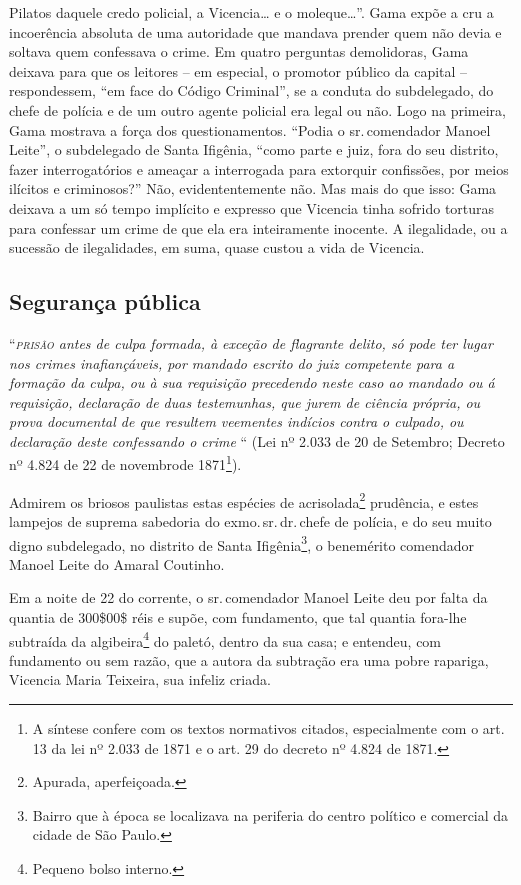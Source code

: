 \begin{didascalia}
{Pilatos daquele credo policial, a Vicencia\ldots{} e o moleque\ldots{}''. Gama
expõe a cru a incoerência absoluta de uma autoridade que mandava prender
quem não devia e soltava quem confessava o crime. Em quatro perguntas
demolidoras, Gama deixava para que os leitores -- em especial, o
promotor público da capital -- respondessem, ``em face do Código
Criminal'', se a conduta do subdelegado, do chefe de polícia e de um
outro agente policial era legal ou não. Logo na primeira, Gama mostrava
a força dos questionamentos. ``Podia o sr.\,comendador Manoel Leite'', o
subdelegado de Santa Ifigênia, ``como parte e juiz, fora do seu distrito,
fazer interrogatórios e ameaçar a interrogada para extorquir confissões,
por meios ilícitos e criminosos?'' Não, evidententemente não. Mas mais do
que isso: Gama deixava a um só tempo implícito e expresso que Vicencia
tinha sofrido torturas para confessar um crime de que ela era
inteiramente inocente. A ilegalidade, ou a sucessão de ilegalidades, em
suma, quase custou a vida de Vicencia.}
\end{didascalia}

\subsection{Segurança pública}

``\emph{\textsc{prisão} antes de culpa formada, à exceção de flagrante delito, só
pode ter lugar nos crimes inafiançáveis, por mandado escrito do juiz
competente para a formação da culpa, ou à sua requisição precedendo
neste caso ao mandado ou á requisição, declaração de duas testemunhas,
que jurem de ciência própria, ou prova documental de que resultem
veementes indícios contra o culpado, ou declaração deste confessando o
crime} `` (Lei nº 2.033 de 20 de Setembro; Decreto nº 4.824 de 22 de
novembrode 1871\footnote{ A síntese confere com os textos normativos
  citados, especialmente com o art. 13 da lei nº 2.033 de 1871 e o art.
  29 do decreto nº 4.824 de 1871.}).

Admirem os briosos paulistas estas espécies de acrisolada\footnote{
  Apurada, aperfeiçoada.} prudência, e estes lampejos de suprema
sabedoria do exmo.\,sr.\,dr.\,chefe de polícia, e do seu muito digno
subdelegado, no distrito de Santa Ifigênia\footnote{ Bairro que à época
  se localizava na periferia do centro político e comercial da cidade de
  São Paulo.}, o benemérito comendador Manoel Leite do Amaral Coutinho.

Em a noite de 22 do corrente, o sr.\,comendador Manoel Leite deu por
falta da quantia de 300\$00\$ réis e supõe, com fundamento, que tal
quantia fora-lhe subtraída da algibeira\footnote{ Pequeno bolso
  interno.} do paletó, dentro da sua casa; e entendeu, com fundamento ou
sem razão, que a autora da subtração era uma pobre rapariga, Vicencia
Maria Teixeira, sua infeliz criada.

